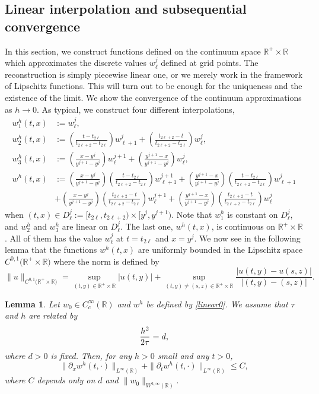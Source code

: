 \documentclass[a4paper,11pt]{article}
\def\R{\mathbb{R}}
\newtheorem{lemma}{Lemma}[section]
\theoremstyle{remark}
\begin{document}
\subsection{Linear interpolation and subsequential convergence}
In this section, we construct functions defined on the continuum space $\R^+\times\R$ which approximates the discrete values $w^j_\ell$ defined at grid points. The reconstruction is simply piecewise linear one, or we merely work in the framework of Lipschitz functions. This will turn out to be enough for the uniqueness and the existence of the limit. We show the convergence of the continuum approximations as $h\to0$. As typical, we construct four different interpolations,
\begin{equation} \label{linear0}
\begin{aligned}
 w_1^h(t,x)&:= w^j_\ell,\\
 w_2^h(t,x)&:= \left(\tfrac{t-t_{2\ell}}{t_{2\ell+2}-t_{2\ell}} \right)
 w_{\ell+1}^{j} + \left(\tfrac{t_{2\ell+2}-t}{t_{2\ell+2}-t_{2\ell}} \right)
 w_{\ell}^{j},\\
 w_3^h(t,x)&:= \left(\tfrac{x-y^j}{y^{j+1}-y^j} \right) w_{\ell}^{j+1}
 + \left(\tfrac{y^{j+1}-x}{y^{j+1}-y^j} \right) w_{\ell}^{j},\\
  w^h(t,x)&:= \left(\tfrac{x-y^j}{y^{j+1}-y^j}
  \right)\left(\tfrac{t-t_{2\ell}}{t_{2\ell+2}-t_{2\ell}} \right)
  w_{\ell+1}^{j+1} + \left(\tfrac{y^{j+1}-x}{y^{j+1}-y^j}
  \right)\left(\tfrac{t-t_{2\ell}}{t_{2\ell+2}-t_{2\ell}} \right)
  w_{\ell+1}^{j}\\
 &+ \left(\tfrac{x-y^j}{y^{j+1}-y^j}
 \right)\left(\tfrac{t_{2\ell+2}-t}{t_{2\ell+2}-t_{2\ell}} \right)
 w_{\ell}^{j+1} + \left(\tfrac{y^{j+1}-x}{y^{j+1}-y^j}
 \right)\left(\tfrac{t_{2\ell+2}-t}{t_{2\ell+2}-t_{2\ell}} \right)
 w_{\ell}^{j}
  \end{aligned}
\end{equation}
when $(t,x)\in D_\ell^j:=[t_{2\ell}, t _{2\ell+2}) \times [y^j, y^{j+1})$. Note that $w_1^h$ is constant on $D_\ell^j$, and $w_2^h$ and $w_3^h$ are linear on $D_\ell^j$. The last one, $w^h(t,x)$, is continuous on $\R^+\times\R$. All of them has the value $w^j_\ell$ at $t=t_{2\ell}$ and $x=y^j$. We now see in the following lemma that the functions $w^h(t,x)$ are uniformly bounded in the Lipschitz space $C^{0,1}\big(\R^+\times \mathbb{R}\big)$ where the norm is defined by
$$\|u\|_{C^{0,1}\big(\R^+\times \mathbb{R}\big)} = \sup_{(t,y)\in \R^+\times \mathbb{R}}|u(t,y)| + \sup_{(t,y)\ne(s,z) \in \R^+\times \mathbb{R}} \frac{|u(t,y)-u(s,z)|}{|(t,y)-(s,z)|}.$$
\begin{lemma} \label{misc}
Let $w_0\in C^{\infty}_c(\R)$ and $w^h$ be defined by \eqref{linear0}. We assume that $\tau$ and $h$ are related by
$$
{h^2\over 2\tau}=d,
$$
where $d>0$ is fixed. Then, for any $h>0$ small and any $t>0$, 
$$\|\partial_x w^h(t,\cdot)\|_{L^\infty(\R)} + \|\partial_t w^h(t,\cdot)\|_{L^\infty(\R)} \le C,$$
where $C$ depends only on $d$ and $\|w_0\|_{W^{2,\infty}(\R)}.$
\end{lemma}
\end{document}

